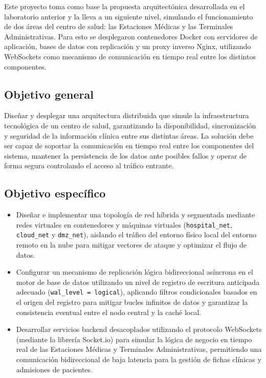 \documentclass[11pt,a4paper]{article}
\begin{document}
Este proyecto toma como base la propuesta arquitectónica desarrollada en el laboratorio anterior y la lleva a un siguiente nivel, simulando el funcionamiento de dos áreas del centro de salud: las Estaciones Médicas y las Terminales Administrativas. Para esto se desplegaron contenedores Docker con servidores de aplicación, bases de datos con replicación y un proxy inverso Nginx, utilizando WebSockets como mecanismo de comunicación en tiempo real entre los distintos componentes.

\subsection{Objetivo general}
Diseñar y desplegar una arquitectura distribuida que simule la infraestructura tecnológica de un centro de salud, garantizando la disponibilidad, sincronización y seguridad de la información clínica entre sus distintas áreas. La solución debe ser capaz de soportar la comunicación en tiempo real entre los componentes del sistema, mantener la persistencia de los datos ante posibles fallos y operar de forma segura controlando el acceso al tráfico entrante.

\subsection{Objetivo específico}
\begin{itemize}
    \item Diseñar e implementar una topología de red híbrida y segmentada mediante redes virtuales en contenedores y máquinas virtuales (\texttt{hospital\_net}, \texttt{cloud\_net} y \texttt{dmz\_net}), aislando el tráfico del entorno físico local del entorno remoto en la nube para mitigar vectores de ataque y optimizar el flujo de datos.
    \item Configurar un mecanismo de replicación lógica bidireccional asíncrona en el motor de base de datos utilizando un nivel de registro de escritura anticipada adecuado (\texttt{wal\_level = logical}), aplicando filtros condicionales basados en el origen del registro para mitigar bucles infinitos de datos y garantizar la consistencia eventual entre el nodo central y la caché local.
    \item Desarrollar servicios backend desacoplados utilizando el protocolo WebSockets (mediante la librería Socket.io) para simular la lógica de negocio en tiempo real de las Estaciones Médicas y Terminales Administrativas, permitiendo una comunicación bidireccional de baja latencia para la gestión de fichas clínicas y admisiones de pacientes.
\end{itemize}
\end{document}
